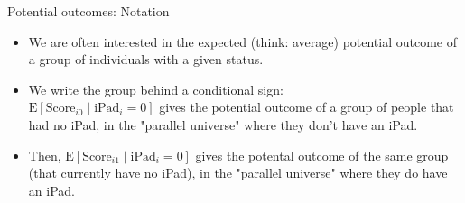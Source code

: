 \documentclass[11pt]{beamer}
\begin{document}
\begin{frame}{Potential outcomes: Notation}
   
\begin{itemize}
\item We are often interested in the expected (think: average) potential outcome of a group of individuals with a given status. 
\item We write the group behind a conditional sign:\\
$\mathrm{E}\left[\text{Score}_{i0} \mid \text{iPad}_{i}=0\right]$ gives the potential outcome of a group of people that had no iPad, in the "parallel universe" where they don't have an iPad. \
\item Then, $\mathrm{E}\left[\text{Score}_{i1} \mid \text{iPad}_{i}=0\right]$ gives the potental outcome of the same group (that currently have no iPad), in the "parallel universe" where they do have an iPad.
\end{itemize}

\end{frame}
\end{document}
